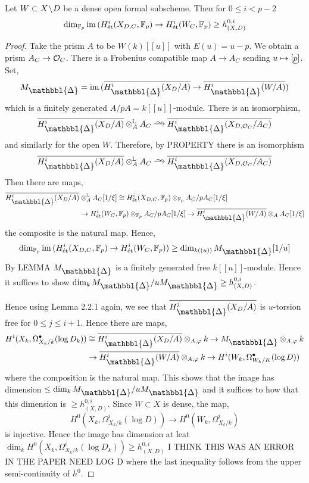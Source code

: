 \documentclass[12pt]{article}
\newcommand{\Prism}{{\mathlarger{\mathbbl{\Delta}}}}
\begin{document}
\begin{prop}
Let $W \subset X \! \setminus \! D$ be a dense open formal subscheme. Then for $0 \le i < p - 2$
\[ \dim_{\mathbb{F}_p} \operatorname{\mathrm{im}}{(H^i_{\text{\'{e}t}}(X_{D,C}, \mathbb{F}_p) \to H^i_{\text{\'{e}t}}(W_C, \mathbb{F}_p)} \ge h^{0,i}_{(X,D)} \]
\end{prop}

\begin{proof}
Take the prism $A$ to be $W(k)[[u]]$ with $E(u) = u - p$. We obtain a prism $A_C \to \mathcal{O}_C$. There is a Frobenius compatible map $A \to A_C$ sending $u \mapsto [\underline{p}]$. Set,
\[ M_{\Prism} = \im{(\ol{H^i_{\Prism}(X_D/A)} \to \ol{H^i_{\Prism}(W/A)})} \]
which is a finitely generated $A / pA = k[[u]]$-module. There is an isomorphism,
\[ \ol{H^i_{\Prism}(X_D/A)} \ot_A^{\LL} A_C \iso \ol{H^i_{\Prism}(X_{D, \cO_C}/A_C)} \]
and similarly for the open $W$. Therefore, by {\color{red} PROPERTY} there is an isomorphism
\[ \ol{H^i_{\Prism}(X_D/A)} \ot_A^{\LL} A_C \iso \ol{H^i_{\Prism}(X_{D, \cO_C}/A_C)} \]
Then there are maps,
\begin{align*}
\ol{H^i_{\Prism}(X_D/A)} & \ot_A^{\LL} A_C [1/\xi] \cong H^i_{\et}(X_{D,C}, \FF_p) \ot_{\FF_p} A_C / p A_C [1/\xi]
\\
& \to H^i_{\et}(W_C, \FF_p) \ot_{\FF_p} A_C / p A_C[1/\xi] \to \ol{H^i_{\Prism}(W/A)} \ot_A A_C[1/\xi] 
\end{align*}
the composite is the natural map. Hence,
\[ \dim_{\FF_p} \im{(H^i_{\et}(X_{D,C}, \FF_p) \to H^i_{\et}(W_C, \FF_p))} \ge \dim_{k((u))} M_{\Prism}[1/u] \]
By {\color{red} LEMMA} $M_{\Prism}$ is a finitely generated free $k[[u]]$-module. Hence it suffices to show $\dim_k M_{\Prism} / u M_{\Prism} \ge h^{0,i}_{(X,D)}$. 


Hence using Lemma 2.2.1 again, we see that $\ol{H^j_{\Prism}(X_D/A)}$ is $u$-torsion free for $0 \le j \le i + 1$. Hence there are maps,
\begin{align*}
H^i(X_k, \Omega^\bullet_{X_k/k}(\log{D_k})) & \cong \ol{H^i_{\Prism}(X_D/A)} \ot_{A, \varphi} k \to M_{\Prism} \ot_{A, \varphi} k 
\\
& \to \ol{H^i_{\Prism}(W/A)} \ot_{A, \varphi} k \to H^i(W_k, \Omega^\bullet_{W_k/K}(\log{D})) 
\end{align*}
where the composition is the natural map. This shows that the image has dimension $\le \dim_k M_{\Prism} / u M_{\Prism}$ and it suffices to how that this dimension is $\ge h^{0,i}_{(X,D)}$. Since $W \subset X$ is dense, the map,
\[ H^0(X_k, \Omega^i_{X_k/k}(\log{D})) \to H^0(W_k, \Omega^i_{X_k/k}) \]
is injective. Hence the image has dimension at leat $\dim_k H^0(X_k, \Omega^i_{X_k/k}(\log{D_k})) \ge h^{0,i}_{(X,D)}$ {\color{red} I THINK THIS WAS AN ERROR IN THE PAPER NEED LOG D} where the last inequality follows from the upper semi-continuity of $h^0$. 
\end{proof}
\end{document}

